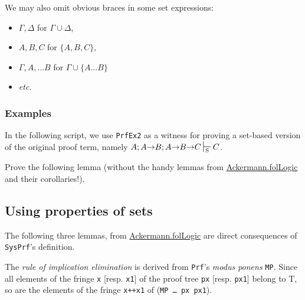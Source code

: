 We may also omit obvious braces in some set expressions:


\begin{itemize}

\item $\Gamma, \Delta$ for $\Gamma\cup\Delta$,
\item $A, B, C$ for $\{A, B, C\}$,
\item $\Gamma, A,\dots B$ for $\Gamma\cup\{A \dots B\}$
\item \emph{etc.}
\end{itemize}

\subsubsection{Examples}


In the following script, we use \texttt{PrfEx2}
as a witness for proving a set-based version of the 
original proof term, namely $A; A \arrow B; A \arrow B \arrow C \sdash C$.





\begin{exercise}

Prove the following lemma (without the handy lemmas from
\href{../theories/html/hydras.Ackermann.folLogic.html}{Ackermann.folLogic} and their corollaries!).


\end{exercise}

\subsection{Using properties of sets}

The following three lemmas, from 
\href{../theories/html/hydras.Ackermann.folLogic.html}{Ackermann.folLogic} are direct consequences of \texttt{SysPrf}'s definition. 



The \emph{rule of implication elimination} is derived from \texttt{Prf}'s 
\emph{modus ponens} \texttt{MP}.  Since all elements of the fringe 
\texttt{x} [resp. \texttt{x1}] of the proof tree \texttt{px} [resp. \texttt{px1}] belong to T, so are the elements of the fringe \texttt{x++x1} of
(\texttt{MP \dots{}  px px1}).


